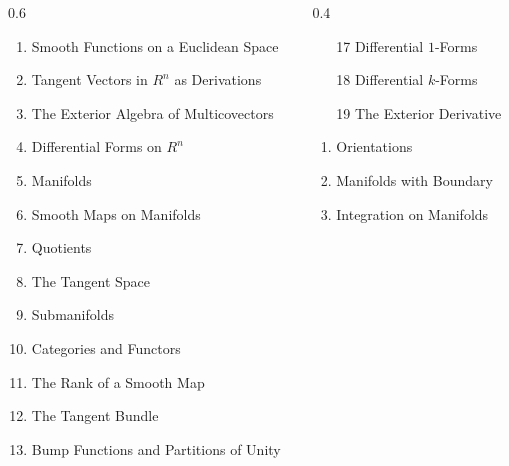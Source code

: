 \begin{frame}
\begin{columns}
  \begin{column}
    {0.6\textwidth}
    \begin{enumerate}
      \item Smooth Functions on a Euclidean Space
      \item Tangent Vectors in $R^n$ as Derivations
      \item The Exterior Algebra of Multicovectors
      \item Differential Forms on $R^n$
      \item Manifolds
      \item Smooth Maps on Manifolds
      \item Quotients
      \item The Tangent Space
      \item Submanifolds
      \item Categories and Functors
      \item The Rank of a Smooth Map
      \item The Tangent Bundle
      \item Bump Functions and Partitions of Unity
    \end{enumerate}
  \end{column}
  \begin{column}
    {0.4\textwidth}
    \begin{enumerate}
      \item[17] Differential $1$-Forms
      \item[18] Differential $k$-Forms
      \item[19] The Exterior Derivative
    \end{enumerate}
    \begin{enumerate}[21]
      \item Orientations
      \item Manifolds with Boundary
      \item Integration on Manifolds
    \end{enumerate}
  \end{column}
\end{columns}

\end{frame}



